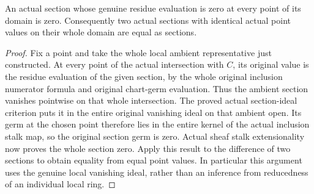 \begin{theorem}
\label{hir:actual-analytic-subspace-section-value-ext}
\leanok
An actual section whose genuine residue evaluation is zero at every point
of its domain is zero. Consequently two actual sections with identical
actual point values on their whole domain are equal as sections.
\end{theorem}
\begin{proof}
Fix a point and take the whole local ambient representative just constructed.
At every point of the actual intersection with $C$, its original value
is the residue evaluation of the given section, by the whole original
inclusion numerator formula and original chart-germ evaluation. Thus the
ambient section vanishes pointwise on that whole intersection. The proved
actual section-ideal criterion puts it in the entire original vanishing
ideal on that ambient open. Its germ at the chosen point therefore lies
in the entire kernel of the actual inclusion stalk map, so the original
section germ is zero. Actual sheaf stalk extensionality now proves the
whole section zero. Apply this result to the difference of two sections
to obtain equality from equal point values. In particular this argument
uses the genuine local vanishing ideal, rather than an inference from
reducedness of an individual local ring.
\end{proof}

